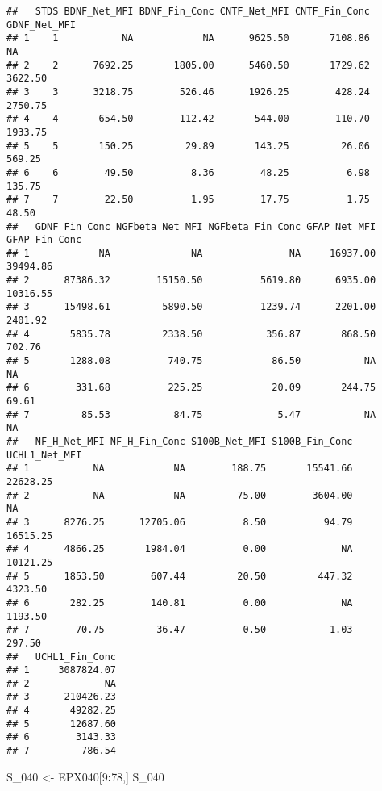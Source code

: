 \documentclass[]{article}
\newenvironment{Shaded}{\begin{snugshade}}{\end{snugshade}}
\newcommand{\DecValTok}[1]{\textcolor[rgb]{0.00,0.00,0.81}{#1}}
\newcommand{\NormalTok}[1]{#1}
\newcommand{\OperatorTok}[1]{\textcolor[rgb]{0.81,0.36,0.00}{\textbf{#1}}}
\newcommand{\StringTok}[1]{\textcolor[rgb]{0.31,0.60,0.02}{#1}}
\begin{document}
\begin{verbatim}
##   STDS BDNF_Net_MFI BDNF_Fin_Conc CNTF_Net_MFI CNTF_Fin_Conc GDNF_Net_MFI
## 1    1           NA            NA      9625.50       7108.86           NA
## 2    2      7692.25       1805.00      5460.50       1729.62      3622.50
## 3    3      3218.75        526.46      1926.25        428.24      2750.75
## 4    4       654.50        112.42       544.00        110.70      1933.75
## 5    5       150.25         29.89       143.25         26.06       569.25
## 6    6        49.50          8.36        48.25          6.98       135.75
## 7    7        22.50          1.95        17.75          1.75        48.50
##   GDNF_Fin_Conc NGFbeta_Net_MFI NGFbeta_Fin_Conc GFAP_Net_MFI GFAP_Fin_Conc
## 1            NA              NA               NA     16937.00      39494.86
## 2      87386.32        15150.50          5619.80      6935.00      10316.55
## 3      15498.61         5890.50          1239.74      2201.00       2401.92
## 4       5835.78         2338.50           356.87       868.50        702.76
## 5       1288.08          740.75            86.50           NA            NA
## 6        331.68          225.25            20.09       244.75         69.61
## 7         85.53           84.75             5.47           NA            NA
##   NF_H_Net_MFI NF_H_Fin_Conc S100B_Net_MFI S100B_Fin_Conc UCHL1_Net_MFI
## 1           NA            NA        188.75       15541.66      22628.25
## 2           NA            NA         75.00        3604.00            NA
## 3      8276.25      12705.06          8.50          94.79      16515.25
## 4      4866.25       1984.04          0.00             NA      10121.25
## 5      1853.50        607.44         20.50         447.32       4323.50
## 6       282.25        140.81          0.00             NA       1193.50
## 7        70.75         36.47          0.50           1.03        297.50
##   UCHL1_Fin_Conc
## 1     3087824.07
## 2             NA
## 3      210426.23
## 4       49282.25
## 5       12687.60
## 6        3143.33
## 7         786.54
\end{verbatim}

\begin{Shaded}
\begin{Highlighting}[]
\NormalTok{S_}\DecValTok{040}\NormalTok{ <-}\StringTok{ }\NormalTok{EPX040[}\DecValTok{9}\OperatorTok{:}\DecValTok{78}\NormalTok{,]}
\NormalTok{S_}\DecValTok{040}
\end{Highlighting}
\end{Shaded}
\end{document}
